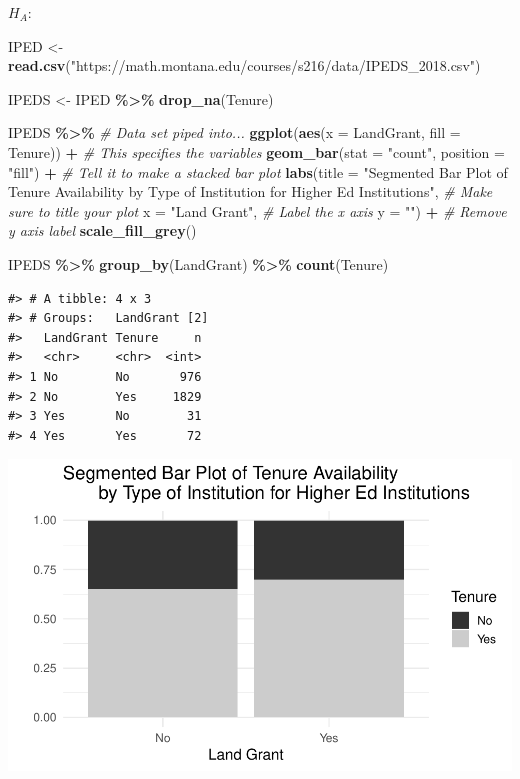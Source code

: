 \documentclass[
]{report}
\newenvironment{Shaded}{\begin{snugshade}}{\end{snugshade}}
\newcommand{\AttributeTok}[1]{\textcolor[rgb]{0.13,0.29,0.53}{#1}}
\newcommand{\CommentTok}[1]{\textcolor[rgb]{0.56,0.35,0.01}{\textit{#1}}}
\newcommand{\FunctionTok}[1]{\textcolor[rgb]{0.13,0.29,0.53}{\textbf{#1}}}
\newcommand{\NormalTok}[1]{#1}
\newcommand{\OtherTok}[1]{\textcolor[rgb]{0.56,0.35,0.01}{#1}}
\newcommand{\SpecialCharTok}[1]{\textcolor[rgb]{0.81,0.36,0.00}{\textbf{#1}}}
\newcommand{\StringTok}[1]{\textcolor[rgb]{0.31,0.60,0.02}{#1}}
\begin{document}
\(H_A:\)

\vspace{0.2in}

\begin{Shaded}
\begin{Highlighting}[]
\NormalTok{IPED }\OtherTok{\textless{}{-}}\FunctionTok{read.csv}\NormalTok{(}\StringTok{"https://math.montana.edu/courses/s216/data/IPEDS\_2018.csv"}\NormalTok{)}

\NormalTok{IPEDS }\OtherTok{\textless{}{-}}\NormalTok{ IPED }\SpecialCharTok{\%\textgreater{}\%}
    \FunctionTok{drop\_na}\NormalTok{(Tenure)}

\NormalTok{IPEDS }\SpecialCharTok{\%\textgreater{}\%} \CommentTok{\# Data set piped into...}
    \FunctionTok{ggplot}\NormalTok{(}\FunctionTok{aes}\NormalTok{(}\AttributeTok{x =}\NormalTok{ LandGrant, }\AttributeTok{fill =}\NormalTok{ Tenure)) }\SpecialCharTok{+}   \CommentTok{\# This specifies the variables}
  \FunctionTok{geom\_bar}\NormalTok{(}\AttributeTok{stat =} \StringTok{"count"}\NormalTok{, }\AttributeTok{position =} \StringTok{"fill"}\NormalTok{) }\SpecialCharTok{+}  \CommentTok{\# Tell it to make a stacked bar plot}
  \FunctionTok{labs}\NormalTok{(}\AttributeTok{title =} \StringTok{"Segmented Bar Plot of Tenure Availability }
\StringTok{       by Type of Institution for Higher Ed Institutions"}\NormalTok{,  }
       \CommentTok{\# Make sure to title your plot }
       \AttributeTok{x =} \StringTok{"Land Grant"}\NormalTok{,   }\CommentTok{\# Label the x axis}
       \AttributeTok{y =} \StringTok{""}\NormalTok{) }\SpecialCharTok{+} \CommentTok{\# Remove y axis label }
    \FunctionTok{scale\_fill\_grey}\NormalTok{()}

\NormalTok{IPEDS }\SpecialCharTok{\%\textgreater{}\%} \FunctionTok{group\_by}\NormalTok{(LandGrant) }\SpecialCharTok{\%\textgreater{}\%} \FunctionTok{count}\NormalTok{(Tenure)}
\end{Highlighting}
\end{Shaded}

\begin{verbatim}
#> # A tibble: 4 x 3
#> # Groups:   LandGrant [2]
#>   LandGrant Tenure     n
#>   <chr>     <chr>  <int>
#> 1 No        No       976
#> 2 No        Yes     1829
#> 3 Yes       No        31
#> 4 Yes       Yes       72
\end{verbatim}

\begin{center}\includegraphics[width=0.7\linewidth]{09-VN09-two-cat-theory_files/figure-latex/unnamed-chunk-1-1} \end{center}
\end{document}
